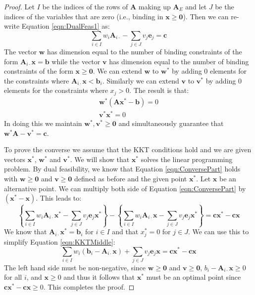 \begin{proof}
Let $I$ be the indices of the rows of $\mathbf{A}$ making up $\mathbf{A}_E$ and let $J$ be the indices of the variables that are zero (i.e., binding in $\mathbf{x} \geq \mathbf{0}$). Then we can re-write Equation \ref{eqn:DualFeas1} as:
\begin{equation}
\sum_{i \in I} w_i \mathbf{A}_{i\cdot} - \sum_{j \in J} v_j \mathbf{e}_j = \mathbf{c}
\label{eqn:ConversePart}
\end{equation}
The vector $\mathbf{w}$ has dimension equal to the number of binding constraints of the form $\mathbf{A}_{i\cdot}\mathbf{x} = \mathbf{b}$ while the vector $\mathbf{v}$ has dimension equal to the number of binding constraints of the form $\mathbf{x} \geq \mathbf{0}$. We can extend $\mathbf{w}$ to $\mathbf{w}^*$ by adding $0$ elements for the constraints where $\mathbf{A}_{i\cdot}\mathbf{x} < \mathbf{b}_i$. Similarly we can extend $\mathbf{v}$ to $\mathbf{v}^*$ by adding $0$ elements for the constraints where $x_j > 0$. The result is that:
\begin{align}
\mathbf{w}^*\left(\mathbf{A}\mathbf{x}^* - \mathbf{b}\right) = 0\\
\mathbf{v}^*\mathbf{x}^* = 0
\end{align}
In doing this we maintain $\mathbf{w}^*,\mathbf{v}^* \geq \mathbf{0}$ and simultaneously guarantee that $\mathbf{w}^* \mathbf{A} - \mathbf{v}^* = \mathbf{c}$. 

To prove the converse we assume that the KKT conditions hold and we are given vectors $\mathbf{x}^*$, $\mathbf{w}^*$ and $\mathbf{v}^*$. We will show that $\mathbf{x}^*$ solves the linear programming problem. By dual feasibility, we know that Equation \ref{eqn:ConversePart} holds with $\mathbf{w} \geq \mathbf{0}$ and $\mathbf{v} \geq \mathbf{0}$ defined as before and the given point $\mathbf{x}^*$. Let $\mathbf{x}$ be an alternative point. 
We can multiply both side of Equation \ref{eqn:ConversePart} by $(\mathbf{x}^* - \mathbf{x})$. This leads to:
\begin{equation}
\left\{\sum_{i \in I} w_i \mathbf{A}_{i\cdot}\mathbf{x}^* - \sum_{j \in J} v_j \mathbf{e}_j\mathbf{x}^*\right\}- 
\left\{\sum_{i \in I} w_i \mathbf{A}_{i\cdot}\mathbf{x} - \sum_{j \in J} v_j \mathbf{e}_j\mathbf{x}^* \right\} = \mathbf{c}\mathbf{x}^* - \mathbf{c}\mathbf{x}
\label{eqn:KKTMiddle}
\end{equation}
We know that $\mathbf{A}_{i\cdot}\mathbf{x}^* = \mathbf{b}_i$ for $i \in I$ and that $x^*_j = 0$ for $j \in J$. We can use this to simplify Equation \ref{eqn:KKTMiddle}:
\begin{equation}
\sum_{i \in I} w_i \left(\mathbf{b}_i - \mathbf{A}_{i\cdot}\mathbf{x}\right) + \sum_{j \in J} v_j \mathbf{e}_j\mathbf{x} = \mathbf{c}\mathbf{x}^* - \mathbf{c}\mathbf{x}
\end{equation}
The left hand side must be non-negative, since $\mathbf{w} \geq \mathbf{0}$ and $\mathbf{v} \geq \mathbf{0}$, $b_i - \mathbf{A}_{i\cdot}\mathbf{x} \geq 0$ for all $i$, and $\mathbf{x} \geq 0$ and thus it follows that $\mathbf{x}^*$ must be an optimal point since $\mathbf{c}\mathbf{x}^* - \mathbf{c}\mathbf{x} \geq 0$. This completes the proof.
\end{proof}
